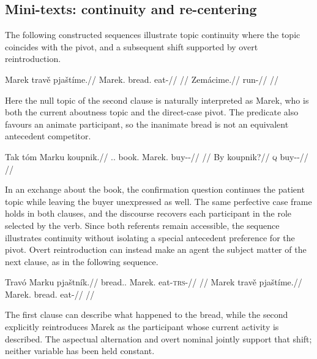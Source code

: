 \subsection{Mini-texts: continuity and re-centering}

The following constructed sequences illustrate topic continuity where the
 topic coincides with the pivot, and a subsequent shift supported by overt
 reintroduction.

\pex
\a
\begingl
\gla Marek travě pjaštíme.//
\glb Marek.\Dir{} bread.\Ind{} eat-\Prog{}//
\glft {}//
\endgl
\a
\begingl
\gla Zemácime.//
\glb run-\Prog{}//
\glft {} //
\endgl
\xe

\noindent Here the null topic of the second clause is naturally interpreted as
Marek, who is both the current aboutness topic and the direct-case pivot.
The predicate  also favours an animate participant, so the
inanimate bread is not an equivalent antecedent competitor.

\pex
\a
\begingl
\gla Tak tóm Marku koupnik.//
\glb \Dem{}.\Prox{}.\Dir{} book.\Dir{} Marek.\Trs{} buy-\Trs{}-\Pf{}//
\glft {}//
\endgl
\a
\begingl
\gla By koupnik?//
\glb \textsc{q} buy-\Trs{}-\Pf{}//
\glft {}
 //
\endgl
\xe

\noindent In an exchange about the book, the confirmation question continues
 the patient topic while leaving the buyer unexpressed as well. The same
 perfective case frame holds in both clauses, and the discourse recovers each
 participant in the role selected by the verb. Since both referents remain
 accessible, the sequence illustrates continuity without isolating a special
 antecedent preference for the pivot. Overt reintroduction can instead make
 an agent the subject matter of the next clause, as in the following sequence.

\pex
\a
\begingl
\gla Travó Marku pjaštník.//
\glb bread.\Dir{}.\Def{} Marek.\Trs{} eat-\textsc{trs}-\Pf{}//
\glft {}//
\endgl
\a
\begingl
\gla Marek travě pjaštíme.//
\glb Marek.\Dir{} bread.\Ind{} eat-\Prog{}//
\glft {} //
\endgl
\xe

\noindent The first clause can describe what happened to the bread, while
 the second explicitly reintroduces Marek as the participant whose current
 activity is described. The aspectual alternation and overt nominal jointly
 support that shift; neither variable has been held constant.

